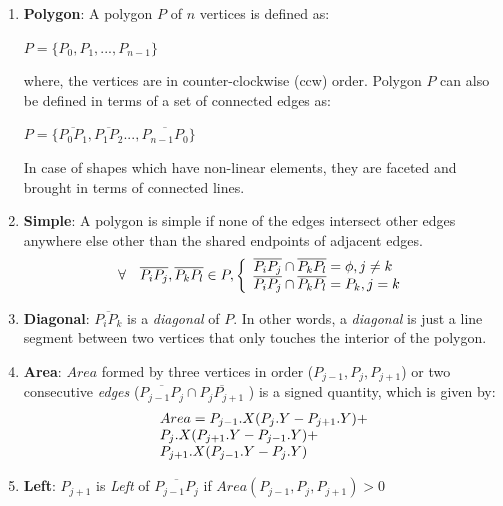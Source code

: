 \begin{enumerate}
\item {\bf Polygon}: A polygon $P$ of $n$ vertices is defined as:

$P = \{P_0,P_1,...,P_{n-1}\}$

where, the vertices are in counter-clockwise (ccw) order. Polygon $P$ can also be defined in terms of a set of connected edges as:

$P = \{\overline{P_0 P_1},\overline{P_1 P_2}...,\overline{P_{n-1} P_0}\}$

In case of shapes which have non-linear elements, they are faceted and brought in terms of connected lines.

\item {\bf Simple}: A polygon is simple if none of the edges intersect other edges anywhere else other than the shared endpoints of adjacent edges.
\begin{displaymath}
\forall \quad \overline{P_i P_j}, \overline{P_k P_l} \in P, \left\{ 
  \begin{array}{l l}
     \overline{P_i P_j} \cap \overline{P_k P_l} = \phi , j \neq k\\
     \overline{P_i P_j} \cap \overline{P_k P_l} = P_k  , j = k
  \end{array} \right.
\end{displaymath}

\item {\bf Diagonal}: $\overline{P_i P_k}$ is a {\em diagonal} of $P$.  In other words, a {\em diagonal} is just a line segment between two vertices that only touches the interior of the polygon.

\item {\bf Area}: $Area$ formed by three vertices in order ($ P_{j-1}, P_j,  P_{j+1}$) or two consecutive {\em edges} ($ \overline{P_{j-1} P_j} \cap \overline{P_j P_{j+1}}$ ) is a signed quantity, which is given by:
\begin{displaymath}
\begin{array}{l l}
Area = P_{j-1}.X ( P_j.Y - P_{j+1}.Y) + \\
P_j.X (P_{j+1}.Y -  P_{j-1}.Y) + \\
P_{j+1}.X ( P_{j-1}.Y - P_j.Y) 
 \end{array} 
\end{displaymath}

\item {\bf Left}: $P_{j+1}$ is {\em Left} of $ \overline{P_{j-1} P_j}$ if $Area( P_{j-1}, P_j,  P_{j+1}) > 0$ 


\end{enumerate}
